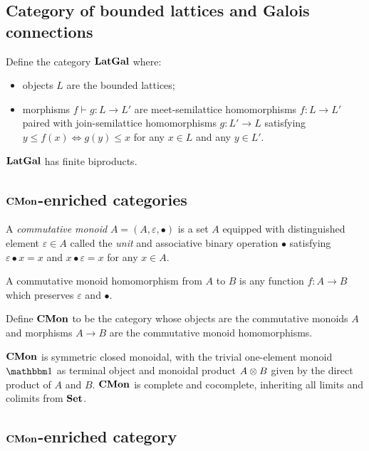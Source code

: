 
\subsection{Category of bounded lattices and Galois connections}

Define the category $\mathbf{LatGal}$ where:
\begin{itemize}
\item objects $L$ are the bounded lattices;
\item morphisms $f \vdash g: L \to L'$ are meet-semilattice homomorphisms $f: L \to L'$ paired with
join-semilattice homomorphisms $g: L' \to L$ satisfying $y \leq f(x) \iff g(y) \leq x$ for any $x \in L$ and any
$y \in L'$.
\end{itemize}

\noindent $\mathbf{LatGal}$ has finite biproducts. 

\subsection{$\mathbf{CMon}$-enriched categories}

\begin{definition}
A \emph{commutative monoid} $A = (A, \varepsilon, \bullet)$ is a set $A$ equipped with distinguished element
$\varepsilon \in A$ called the \emph{unit} and associative binary operation $\bullet$ satisfying $\varepsilon
\bullet x = x$ and $x \bullet \varepsilon = x$ for any $x \in A$.
\end{definition}

A commutative monoid homomorphism from $A$ to $B$ is any function $f: A \to B$ which preserves $\varepsilon$
and $\bullet$.

\begin{definition}
Define $\mathbf{CMon}$ to be the category whose objects are the commutative monoids $A$ and morphisms $A \to B$ are
the commutative monoid homomorphisms.
\end{definition}

$\mathbf{CMon}$ is symmetric closed monoidal, with the trivial one-element monoid $\One$ as terminal object and
monoidal product $A \otimes B$ given by the direct product of $A$ and $B$. $\mathbf{CMon}$ is complete and cocomplete,
inheriting all limits and colimits from $\mathbf{Set}$.

\subsection{$\mathbf{CMon}$-enriched category}

